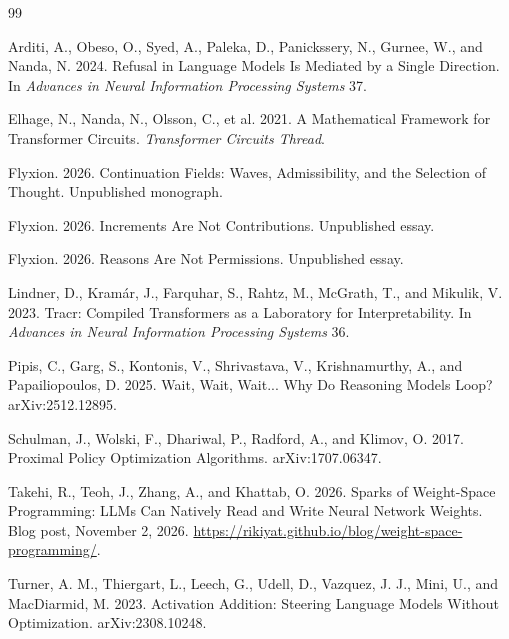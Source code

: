 \documentclass[11pt]{article}
\begin{document}
\begin{thebibliography}{99}
\small
\setlength{\itemsep}{0pt}

 Arditi, A., Obeso, O., Syed, A., Paleka, D., Panickssery, N., Gurnee, W., and Nanda, N. 2024. Refusal in Language Models Is Mediated by a Single Direction. In \emph{Advances in Neural Information Processing Systems} 37.

 Elhage, N., Nanda, N., Olsson, C., et al. 2021. A Mathematical Framework for Transformer Circuits. \emph{Transformer Circuits Thread}.

 Flyxion. 2026. Continuation Fields: Waves, Admissibility, and the Selection of Thought. Unpublished monograph.

 Flyxion. 2026. Increments Are Not Contributions. Unpublished essay.

 Flyxion. 2026. Reasons Are Not Permissions. Unpublished essay.

 Lindner, D., Kram\'ar, J., Farquhar, S., Rahtz, M., McGrath, T., and Mikulik, V. 2023. Tracr: Compiled Transformers as a Laboratory for Interpretability. In \emph{Advances in Neural Information Processing Systems} 36.

 Pipis, C., Garg, S., Kontonis, V., Shrivastava, V., Krishnamurthy, A., and Papailiopoulos, D. 2025. Wait, Wait, Wait... Why Do Reasoning Models Loop? arXiv:2512.12895.

 Schulman, J., Wolski, F., Dhariwal, P., Radford, A., and Klimov, O. 2017. Proximal Policy Optimization Algorithms. arXiv:1707.06347.

 Takehi, R., Teoh, J., Zhang, A., and Khattab, O. 2026. Sparks of Weight-Space Programming: LLMs Can Natively Read and Write Neural Network Weights. Blog post, November 2, 2026. \url{https://rikiyat.github.io/blog/weight-space-programming/}.

 Turner, A. M., Thiergart, L., Leech, G., Udell, D., Vazquez, J. J., Mini, U., and MacDiarmid, M. 2023. Activation Addition: Steering Language Models Without Optimization. arXiv:2308.10248.

\end{thebibliography}
\end{document}
